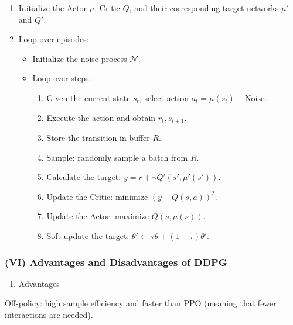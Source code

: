 \begin{enumerate}
\def\labelenumi{\arabic{enumi}.}
\tightlist
\item
  Initialize the Actor \(\mu\), Critic \(Q\), and their corresponding target networks \(\mu'\) and \(Q'\).
\item
{}
  Loop over episodes:

  \begin{itemize}
  \tightlist
  \item
    Initialize the noise process \(\mathcal{N}\).
  \item
{}
    Loop over steps:

    \begin{enumerate}
    \def\labelenumii{\arabic{enumii}.}
    \tightlist
    \item
      Given the current state \(s_t\), select action \(a_t=\mu(s_t)+\mathrm{Noise}\).
    \item
      Execute the action and obtain \(r_t,s_{t+1}\).
    \item
      Store the transition in buffer \(R\).
    \item
      Sample: randomly sample a batch from \(R\).
    \item
      Calculate the target: \(y=r+\gamma Q'(s',\mu'(s'))\).
    \item
      Update the Critic: minimize \((y-Q(s,a))^{2}\).
    \item
      Update the Actor: maximize \(Q(s,\mu(s))\).
    \item
      Soft-update the target: \(\theta'\leftarrow\tau\theta+(1-\tau)\theta'\).
    \end{enumerate}
  \end{itemize}
\end{enumerate}

\hypertarget{vi-advantages-and-disadvantages-of-ddpg}{%
\subsubsection{(VI) Advantages and Disadvantages of DDPG}\label{vi-advantages-and-disadvantages-of-ddpg}}

\begin{enumerate}
\def\labelenumi{\arabic{enumi}.}
\tightlist
\item
  Advantages
\end{enumerate}

Off-policy: high sample efficiency and faster than PPO (meaning that fewer interactions are needed).

